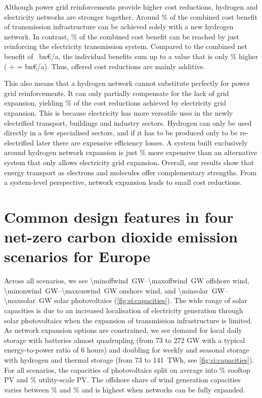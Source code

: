Although power grid reinforcements provide higher cost reductions, hydrogen and
electricity networks are stronger together. Around \hyoftotalbenefit\% of the
combined cost benefit of transmission infrastructure can be achieved solely with
a new hydrogen network. In contrast, \acoftotalbenefit\% of the combined cost
benefit can be reached by just reinforcing the electricity transmission system.
Compared to the combined net benefit of \gridbenefitabs~bn\euro/a, the
individual benefits sum up to a value that is only \additivebenefitrel\% higher
(\maxacbenefitabs{} + \maxhybenefitabs{} = \additivebenefitabs{} bn\euro/a).
Thus, offered cost reductions are mainly additive.

This also means that a hydrogen network cannot substitute perfectly for power
grid reinforcements. It can only partially compensate for the lack of grid
expansion, yielding \benefithyofac\% of the cost reductions achieved by
electricity grid expansion. This is because electricity has more versatile uses
in the newly electrified transport, buildings and industry sectors. Hydrogen can
only be used directly in a few specialised sectors, and if it has to be produced
only to be re-electrified later there are expensive efficiency losses.  A system
built exclusively around hydrogen network expansion is just \acvshycost\% more
expensive than an alternative system that only allows electricity grid
expansion. Overall, our results show that energy transport as electrons and
molecules offer complementary strengths. From a system-level perspective,
network expansion leads to small cost reductions.

\section*{Common design features in four net-zero carbon dioxide emission scenarios for Europe}
\label{sec:es}

Across all scenarios, we see \SIrange{\minoffwind}{\maxoffwind}{\giga\watt}
offshore wind, \SIrange{\minonwind}{\maxonwind}{\giga\watt} onshore wind, and
\SIrange{\minsolar}{\maxsolar}{\giga\watt} solar photovoltaics
(\cref{fig:si:capacities}). The wide range of solar capacities is due to an
increased localisation of electricity generation through solar photovoltaics
when the expansion of transmission infrastructure is limited. As network
expansion options are constrained, we see demand for local daily storage with
batteries almost quadrupling (from 73 to 272 GW with a typical energy-to-power
ratio of 6 hours) and doubling for weekly and seasonal storage with hydrogen and
thermal storage (from 73 to 141~TWh, see \cref{fig:si:capacities}). For all
scenarios, the capacities of photovoltaics split on average into
\meanrooftopshare\% rooftop PV and \meanutilityshare\% utility-scale PV. The
offshore share of wind generation capacities varies between \minoffshoreshare\%
and \maxoffshoreshare\% and is highest when networks can be fully expanded.

